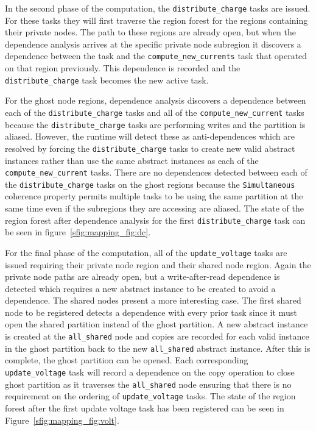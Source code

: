 In the second phase of the computation, the {\tt distribute\_charge} tasks
are issued.  For these tasks they will first traverse the region forest
for the regions containing their private nodes.  The path to these regions are
already open, but when the dependence analysis arrives at the specific private node subregion it 
discovers a dependence between the task and the {\tt compute\_new\_currents} task that operated
on that region previously.  This dependence is recorded and the 
{\tt distribute\_charge} task becomes the new active task.

For the ghost node regions, dependence analysis discovers 
a dependence between each of the {\tt distribute\_charge} tasks and all of the
{\tt compute\_new\_current} tasks because the {\tt distribute\_charge} tasks are
performing writes and the partition is aliased.  However, the runtime will detect these as
anti-dependences which are resolved by forcing the {\tt distribute\_charge} tasks to
create new valid abstract instances rather than use the same abstract instances as
each of the {\tt compute\_new\_current} tasks.  There are no dependences detected
between each of the {\tt distribute\_charge} tasks on the ghost regions because
the {\tt Simultaneous} coherence property permits multiple tasks to be using the same
partition at the same time even if the subregions they are accessing are aliased.  The
state of the region forest after dependence analysis for the first {\tt distribute\_charge} task can
be seen in figure~\ref{sfig:mapping_fig:dc}.

For the final phase of the computation, all of the {\tt update\_voltage} tasks
are issued requiring their private node region and their shared node region.  Again
the private node paths are already open, but a write-after-read dependence is detected which
requires a new abstract instance to be created to avoid a dependence.  The
shared nodes present a more interesting case.  The first shared node to be registered
detects a dependence with every prior task since it must open the shared partition
instead of the ghost partition.  A new abstract instance is created at the 
{\tt all\_shared} node and copies are recorded for each valid instance in the ghost partition
back to the new {\tt all\_shared} abstract instance.  After this is complete, the
ghost partition can be opened.  Each corresponding {\tt update\_voltage} task will record
a dependence on the copy operation to close ghost partition as it traverses the {\tt all\_shared}
node ensuring that there is no requirement on the ordering of {\tt update\_voltage}
tasks.  The state of the region forest after the first update voltage task
has been registered can be seen in Figure~\ref{sfig:mapping_fig:volt}.

